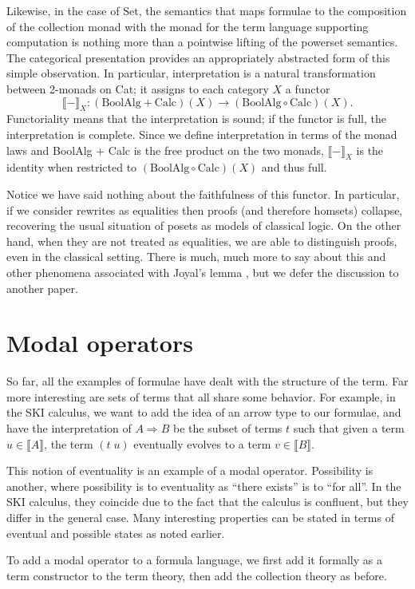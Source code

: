 \documentclass{llncs}
\newcommand{\interp}[1]{\llbracket #1 \rrbracket}
\newcommand{\maps}{\colon}
\renewcommand{\:}{\colon}
\newcommand{\Set}{\mathrm{Set}}
\newcommand{\Calc}{\mathrm{Calc}}
\newcommand{\BoolAlg}{\mathrm{BoolAlg}}
\begin{document}
Likewise, in the case of $\Set$, the semantics that maps formulae to
the composition of the collection monad with the monad for the term
language supporting computation is nothing more than a pointwise
lifting of the powerset semantics.  The categorical presentation
provides an appropriately abstracted form of this simple
observation. In particular, interpretation is a natural transformation
between 2-monads on Cat; it assigns to each category $X$ a functor
\[\interp{-}_X\maps (\BoolAlg + \Calc)(X) \to (\BoolAlg \circ \Calc)(X).\]
Functoriality means that the interpretation is sound; if the functor is full, the interpretation is complete. Since we define interpretation in terms of the monad laws and BoolAlg + Calc is the free product on the two monads, $\interp{-}_X$ is the identity when restricted to $(\BoolAlg \circ \Calc)(X)$ and thus full.

Notice we have said nothing about the faithfulness of this functor. In
particular, if we consider rewrites as equalities then proofs (and
therefore homsets) collapse, recovering the usual situation of posets as models
of classical logic. On the other hand, when they are not treated as
equalities, we are able to distinguish proofs, even in the classical
setting. There is much, much more to say about this and other
phenomena associated with Joyal's lemma \cite{0910.2401}, but we defer the discussion
to another paper.

\section{Modal operators}

So far, all the examples of formulae have dealt with the structure of the term.  Far more interesting are sets of terms that all share some behavior.  For example, in the SKI calculus, we want to add the idea of an arrow type to our formulae, and have the interpretation of $A \Rightarrow B$ be the subset of terms $t$ such that given a term $u\in\interp{A}$, the term $(t\; u)$ eventually evolves to a term $v\in\interp{B}.$

This notion of eventuality is an example of a modal operator.  Possibility is another, where possibility is to eventuality as ``there exists'' is to ``for all''.  In the SKI calculus, they coincide due to the fact that the calculus is confluent, but they differ in the general case.  Many interesting properties can be stated in terms of eventual and possible states as noted earlier.

To add a modal operator to a formula language, we first add it formally as a term constructor to the term theory, then add the collection theory as before.  
\end{document}
